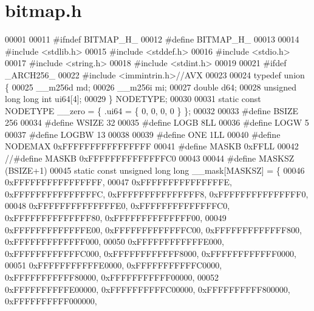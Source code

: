 \section{bitmap.\+h}
\label{direct_2bitmap_8h_source}

\begin{DoxyCode}
00001 
00011 \textcolor{preprocessor}{#ifndef BITMAP\_H\_}
00012 \textcolor{preprocessor}{#define BITMAP\_H\_}
00013 
00014 \textcolor{preprocessor}{#include <stdlib.h>}
00015 \textcolor{preprocessor}{#include <stddef.h>}
00016 \textcolor{preprocessor}{#include <stdio.h>}
00017 \textcolor{preprocessor}{#include <string.h>}
00018 \textcolor{preprocessor}{#include <stdint.h>}
00019 
00021 \textcolor{preprocessor}{#ifdef \_ARCH256\_}
00022 \textcolor{preprocessor}{#include <immintrin.h>}\textcolor{comment}{//AVX}
00023 
00024 \textcolor{keyword}{typedef} \textcolor{keyword}{union }\{
00025     \_\_m256d md;
00026     \_\_m256i mi;
00027     \textcolor{keywordtype}{double} d64;
00028     \textcolor{keywordtype}{unsigned} \textcolor{keywordtype}{long} \textcolor{keywordtype}{long} \textcolor{keywordtype}{int} ui64[4];
00029 \} NODETYPE; 
00030 
00031 \textcolor{keyword}{static} \textcolor{keyword}{const} NODETYPE \_\_zero = \{ .ui64 = \{ 0, 0, 0, 0 \} \};
00032 
00033 \textcolor{preprocessor}{#define BSIZE 256}
00034 \textcolor{preprocessor}{#define WSIZE 32}
00035 \textcolor{preprocessor}{#define LOGB 8LL}
00036 \textcolor{preprocessor}{#define LOGW 5}
00037 \textcolor{preprocessor}{#define LOGBW 13}
00038 
00039 \textcolor{preprocessor}{#define ONE 1LL}
00040 \textcolor{preprocessor}{#define NODEMAX 0xFFFFFFFFFFFFFFFF}
00041 \textcolor{preprocessor}{#define MASKB 0xFFLL}
00042 \textcolor{comment}{//#define MASKB 0xFFFFFFFFFFFFFFC0}
00043 
00044 \textcolor{preprocessor}{#define MASKSZ (BSIZE+1)}
00045 \textcolor{keyword}{static} \textcolor{keyword}{const} \textcolor{keywordtype}{unsigned} \textcolor{keywordtype}{long} \textcolor{keywordtype}{long} \_\_mask[MASKSZ] = \{
00046         0xFFFFFFFFFFFFFFFF,
00047         0xFFFFFFFFFFFFFFFE, 0xFFFFFFFFFFFFFFFC, 0xFFFFFFFFFFFFFFF8, 0xFFFFFFFFFFFFFFF0,
00048         0xFFFFFFFFFFFFFFE0, 0xFFFFFFFFFFFFFFC0, 0xFFFFFFFFFFFFFF80, 0xFFFFFFFFFFFFFF00,
00049         0xFFFFFFFFFFFFFE00, 0xFFFFFFFFFFFFFC00, 0xFFFFFFFFFFFFF800, 0xFFFFFFFFFFFFF000,
00050         0xFFFFFFFFFFFFE000, 0xFFFFFFFFFFFFC000, 0xFFFFFFFFFFFF8000, 0xFFFFFFFFFFFF0000,
00051         0xFFFFFFFFFFFE0000, 0xFFFFFFFFFFFC0000, 0xFFFFFFFFFFF80000, 0xFFFFFFFFFFF00000,
00052         0xFFFFFFFFFFE00000, 0xFFFFFFFFFFC00000, 0xFFFFFFFFFF800000, 0xFFFFFFFFFF000000,

\end{DoxyCode}
